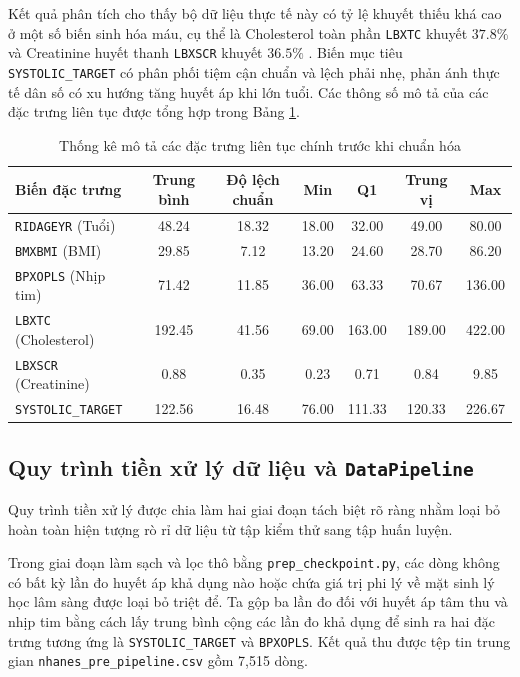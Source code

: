 \documentclass[12pt,a4paper]{article}
\begin{document}
Kết quả phân tích cho thấy bộ dữ liệu thực tế này có tỷ lệ khuyết thiếu khá cao ở một số biến sinh hóa máu, cụ thể là Cholesterol toàn phần \texttt{LBXTC} khuyết $37.8\%$ và Creatinine huyết thanh \texttt{LBXSCR} khuyết $36.5\%$ . Biến mục tiêu \texttt{SYSTOLIC\_TARGET} có phân phối tiệm cận chuẩn và lệch phải nhẹ, phản ánh thực tế dân số có xu hướng tăng huyết áp khi lớn tuổi. Các thông số mô tả của các đặc trưng liên tục được tổng hợp trong Bảng \ref{tab:eda_summary}.

\begin{table}[H]
\centering
\caption{Thống kê mô tả các đặc trưng liên tục chính trước khi chuẩn hóa}
\label{tab:eda_summary}
\small
\begin{tabular}{lcccccc}
\toprule
\textbf{Biến đặc trưng} & \textbf{Trung bình} & \textbf{Độ lệch chuẩn} & \textbf{Min} & \textbf{Q1} & \textbf{Trung vị} & \textbf{Max} \\
\midrule
\texttt{RIDAGEYR} (Tuổi) & 48.24 & 18.32 & 18.00 & 32.00 & 49.00 & 80.00 \\
\texttt{BMXBMI} (BMI) & 29.85 & 7.12 & 13.20 & 24.60 & 28.70 & 86.20 \\
\texttt{BPXOPLS} (Nhịp tim) & 71.42 & 11.85 & 36.00 & 63.33 & 70.67 & 136.00 \\
\texttt{LBXTC} (Cholesterol) & 192.45 & 41.56 & 69.00 & 163.00 & 189.00 & 422.00 \\
\texttt{LBXSCR} (Creatinine) & 0.88 & 0.35 & 0.23 & 0.71 & 0.84 & 9.85 \\
\texttt{SYSTOLIC\_TARGET} & 122.56 & 16.48 & 76.00 & 111.33 & 120.33 & 226.67 \\
\bottomrule
\end{tabular}
\end{table}

\subsection{Quy trình tiền xử lý dữ liệu và \texttt{DataPipeline}}
Quy trình tiền xử lý được chia làm hai giai đoạn tách biệt rõ ràng nhằm loại bỏ hoàn toàn hiện tượng rò rỉ dữ liệu từ tập kiểm thử sang tập huấn luyện.

Trong giai đoạn làm sạch và lọc thô bằng \texttt{prep\_checkpoint.py}, các dòng không có bất kỳ lần đo huyết áp khả dụng nào hoặc chứa giá trị phi lý về mặt sinh lý học lâm sàng được loại bỏ triệt để. Ta gộp ba lần đo đối với huyết áp tâm thu và nhịp tim bằng cách lấy trung bình cộng các lần đo khả dụng để sinh ra hai đặc trưng tương ứng là \texttt{SYSTOLIC\_TARGET} và \texttt{BPXOPLS}. Kết quả thu được tệp tin trung gian \texttt{nhanes\_pre\_pipeline.csv} gồm 7,515 dòng.
\end{document}
